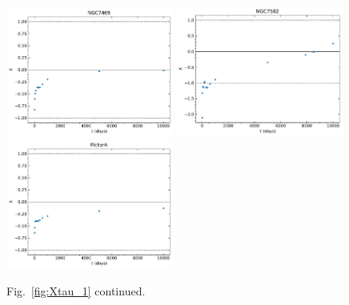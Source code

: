 \begin{figure}
\begin{center}
    {
  \includegraphics[width=0.49\textwidth]{Figs/Chapter5/X_tau/X_tau_NGC7469.pdf}  
  \includegraphics[width=0.49\textwidth]{Figs/Chapter5/X_tau/X_tau_NGC7582.pdf}  \hfill\\
  \includegraphics[width=0.49\textwidth]{Figs/Chapter5/X_tau/X_tau_PictorA.pdf}
  \caption{Fig.~\ref{fig:Xtau_1} continued.}
    \label{fig:Xtau_6}
  }
\end{center}
\end{figure}

